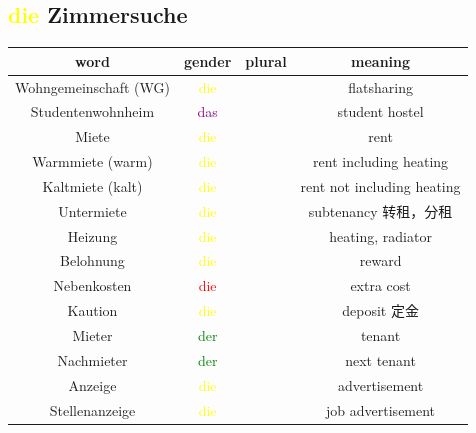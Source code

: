 \subsection{\textcolor{yellow}{die} Zimmersuche}
\begin{center}
    \begin{tabular}{|c|c|c|c|}
        \hline
        \rowcolor{gray}
        word                  & gender                  & plural & meaning                    \\
        \hline
        Wohngemeinschaft (WG) & \textcolor{yellow}{die} &        & flatsharing                \\
        Studentenwohnheim     & \textcolor{purple}{das} &        & student hostel             \\
        \hline
        Miete                 & \textcolor{yellow}{die} &        & rent                       \\
        Warmmiete (warm)      & \textcolor{yellow}{die} &        & rent including heating     \\
        Kaltmiete (kalt)      & \textcolor{yellow}{die} &        & rent not including heating \\
        Untermiete            & \textcolor{yellow}{die} &        & subtenancy 转租，分租           \\
        Heizung               & \textcolor{yellow}{die} &        & heating, radiator          \\
        Belohnung             & \textcolor{yellow}{die} &        & reward                     \\
        Nebenkosten           & \textcolor{red}{die}    &        & extra cost                 \\
        Kaution               & \textcolor{yellow}{die} &        & deposit 定金                 \\
        \hline
        Mieter                & \textcolor{green}{der}  &        & tenant                     \\
        Nachmieter            & \textcolor{green}{der}  &        & next tenant                \\
        \hline
        Anzeige               & \textcolor{yellow}{die} &        & advertisement              \\
        Stellenanzeige        & \textcolor{yellow}{die} &        & job advertisement          \\
        \hline
    \end{tabular}
\end{center}

